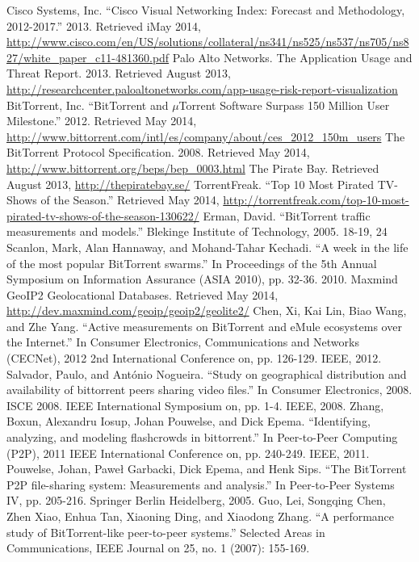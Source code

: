 \documentclass[conference]{IEEEtran}
\begin{document}
\begin{thebibliography}{1}
Cisco Systems, Inc. ``Cisco Visual Networking Index: Forecast and Methodology, 2012-2017.'' 2013. Retrieved iMay 2014, \url{http://www.cisco.com/en/US/solutions/collateral/ns341/ns525/ns537/ns705/ns827/white_paper_c11-481360.pdf}
Palo Alto Networks. The Application Usage and Threat Report. 2013. Retrieved August 2013, \url{http://researchcenter.paloaltonetworks.com/app-usage-risk-report-visualization}
BitTorrent, Inc. ``BitTorrent and $\mu$Torrent Software Surpass 150 Million User Milestone.'' 2012. Retrieved May 2014, \url{http://www.bittorrent.com/intl/es/company/about/ces_2012_150m_users}
The BitTorrent Protocol Specification. 2008. Retrieved May 2014,\\ \url{http://www.bittorrent.org/beps/bep_0003.html}
The Pirate Bay. Retrieved August 2013, \url{http://thepiratebay.se/}
TorrentFreak. ``Top 10 Most Pirated TV-Shows of the Season.'' Retrieved May 2014, \url{http://torrentfreak.com/top-10-most-pirated-tv-shows-of-the-season-130622/}
Erman, David. ``BitTorrent traffic measurements and models.'' Blekinge Institute of Technology, 2005. 18-19, 24
Scanlon, Mark, Alan Hannaway, and Mohand-Tahar Kechadi. ``A week in the life of the most popular BitTorrent swarms.'' In Proceedings of the 5th Annual Symposium on Information Assurance (ASIA 2010), pp. 32-36. 2010.
Maxmind GeoIP2 Geolocational Databases. Retrieved May 2014,\\ \url{http://dev.maxmind.com/geoip/geoip2/geolite2/}
Chen, Xi, Kai Lin, Biao Wang, and Zhe Yang. ``Active measurements on BitTorrent and eMule ecosystems over the Internet.'' In Consumer Electronics, Communications and Networks (CECNet), 2012 2nd International Conference on, pp. 126-129. IEEE, 2012.
Salvador, Paulo, and António Nogueira. ``Study on geographical distribution and availability of bittorrent peers sharing video files.'' In Consumer Electronics, 2008. ISCE 2008. IEEE International Symposium on, pp. 1-4. IEEE, 2008.
Zhang, Boxun, Alexandru Iosup, Johan Pouwelse, and Dick Epema. ``Identifying, analyzing, and modeling flashcrowds in bittorrent.'' In Peer-to-Peer Computing (P2P), 2011 IEEE International Conference on, pp. 240-249. IEEE, 2011.
Pouwelse, Johan, Paweł Garbacki, Dick Epema, and Henk Sips. ``The BitTorrent P2P file-sharing system: Measurements and analysis.'' In Peer-to-Peer Systems IV, pp. 205-216. Springer Berlin Heidelberg, 2005.
Guo, Lei, Songqing Chen, Zhen Xiao, Enhua Tan, Xiaoning Ding, and Xiaodong Zhang. ``A performance study of BitTorrent-like peer-to-peer systems.'' Selected Areas in Communications, IEEE Journal on 25, no. 1 (2007): 155-169.
\end{thebibliography}
\end{document}
